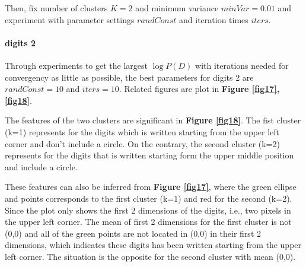 \documentclass{article}
\begin{document}
Then, fix number of clusters $K=2$ and minimum variance $minVar=0.01$ and experiment with parameter settings $randConst$ and iteration times $iters$.

\paragraph{digits 2}
Through experiments to get the largest $\log P(D)$ with iterations needed for convergency as little as possible, the best parameters for digits 2 are $randConst = 10$ and $iters = 10$. Related figures are plot in \textbf{Figure \ref{fig17},\ref{fig18}}.\par
The features of the two clusters are significant in \textbf{Figure \ref{fig18}}. The fist cluster (k=1) represents for the digits which is written starting from the upper left corner and don't include a circle. On the contrary, the second cluster (k=2) represents for the digits that is written starting form the upper middle position and include a circle.\par
These features can also be inferred from \textbf{Figure \ref{fig17}}, where the green ellipse and points corresponds to the first cluster (k=1) and red for the second (k=2). Since the plot only shows the first 2 dimensions of the digits, i.e., two pixels in the upper left corner. The mean of first 2 dimensions for the first cluster is not (0,0) and all of the green points are not located in (0,0) in their first 2 dimensions, which indicates these digits has been written starting from the upper left corner. The situation is the opposite for the second cluster with mean (0,0).\par
\end{document}
